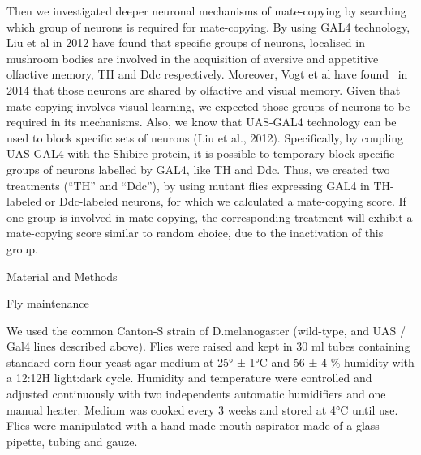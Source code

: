 \documentclass{article}
\begin{document}
Then we investigated deeper neuronal mechanisms of mate-copying by searching which group of neurons is required for mate-copying. By using GAL4 technology, Liu et al in 2012 have found that specific groups of neurons, localised in mushroom bodies are involved in the acquisition of aversive and appetitive olfactive memory, TH and Ddc respectively. Moreover, Vogt et al have found \ in 2014 that those neurons are shared by olfactive and visual memory. Given that mate-copying involves visual learning, we expected those groups of neurons to be required in its mechanisms. Also, we know that UAS-GAL4 technology can be used to block specific sets of neurons (Liu et al., 2012). Specifically, by coupling UAS-GAL4 with the Shibire protein, it is possible to temporary block specific groups of neurons labelled by GAL4, like TH and Ddc. Thus, we created two treatments (“TH” and “Ddc”), by using mutant flies expressing GAL4 in TH-labeled or Ddc-labeled neurons, for which we calculated a mate-copying score. If one group is involved in mate-copying, the corresponding treatment will exhibit a mate-copying score similar to random choice, due to the inactivation of this group.


\bigskip


\bigskip


\bigskip


\bigskip


\bigskip


\bigskip


\bigskip


\bigskip


\bigskip


\bigskip


\bigskip

Material and Methods


\bigskip


\bigskip

Fly maintenance


\bigskip

We used the common Canton-S strain of D.melanogaster (wild-type, and UAS / Gal4 lines described above). Flies were raised and kept in 30 ml tubes containing standard corn flour-yeast-agar medium at 25° ± 1°C and 56 ± 4 \% humidity with a 12:12H light:dark cycle. Humidity and temperature were controlled and adjusted continuously with two independents automatic humidifiers and one manual heater. Medium was cooked every 3 weeks and stored at 4°C until use. Flies were manipulated with a hand-made mouth aspirator made of a glass pipette, tubing and gauze.
\end{document}
